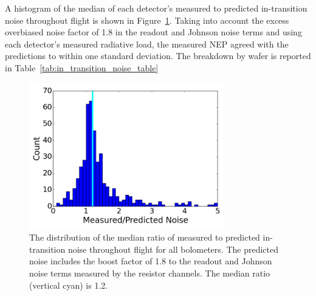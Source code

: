 A histogram of the median of each detector's measured to predicted in-transition noise throughout flight is shown in Figure~\ref{fig:in_transition_noise_hist}.
Taking into account the excess overbiased noise factor of 1.8 in the readout and Johnson noise terms and using each detector's measured radiative load, the measured \ac{NEP} agreed with the predictions to within one standard deviation. 
The breakdown by wafer is reported in Table~\ref{tab:in_transition_noise_table}


\begin{figure}[hp]
\begin{center}
\includegraphics[height=2.5in]{figures/in_transition_histogram.png}
\caption[In-transition measured to predicted noise ratio histogram]{The distribution of the median ratio of measured to predicted in-transition noise throughout flight for all bolometers. The predicted noise includes the boost factor of 1.8 to the readout and Johnson noise terms measured by the resistor channels. 
The median ratio (vertical cyan) is 1.2. 
\label{fig:in_transition_noise_hist} }
\end{center}
\end{figure}


